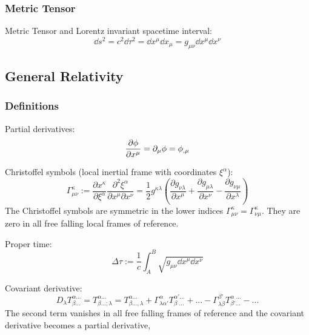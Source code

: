 	\subsubsection{Metric Tensor}
		Metric Tensor and Lorentz invariant spacetime interval:
		\begin{equation}
			\dd s^2 = c^2 \dd \tau^2 = \dd x^\mu \dd x_\mu = g_{\mu\nu} \dd x^\mu \dd x^\nu
		\end{equation}

	\subsection{General Relativity}
		\subsubsection{Definitions}
			\noindent
			Partial derivatives:
			\begin{equation}
				\frac{\partial \phi}{\partial x^\mu} = \partial_\mu \phi = \phi_{,\mu}
			\end{equation}

			\noindent
			Christoffel symbols (local inertial frame with coordinates $\xi^\alpha$):
			\begin{equation}
				\Gamma_{\mu\nu}^{\kappa} := \frac{\partial x^\kappa}{\partial \xi^\alpha}\frac{\partial^2 \xi^\alpha}{\partial x^\mu\partial x^\nu}
				=\frac{1}{2}g^{\kappa\lambda}\left(\frac{\partial g_{\nu\lambda}}{\partial x^\mu}+\frac{\partial g_{\mu\lambda}}{\partial x^\nu}-\frac{\partial g_{\nu\mu}}{\partial x^\lambda}\right)
			\end{equation}
			The Christoffel symbols are symmetric in the lower indices $\Gamma_{\mu\nu}^{\kappa} = \Gamma_{\nu\mu}^{\kappa}$. They are zero in all free falling local frames of reference.

			\noindent
			Proper time:
			\begin{equation}
				\Delta\tau := \frac{1}{c}\int_A^B\sqrt{g_{\mu\nu}\dd x^\mu \dd x^\nu}
			\end{equation}

			\noindent
			Covariant derivative:
			\begin{equation}
				D_\lambda T^{\alpha ...}_{\beta...} =
				T^{\alpha ...}_{\beta...;\lambda} = T^{\alpha...}_{\beta ...,\lambda}
				+ \Gamma^\alpha_{\lambda\alpha'} T^{\alpha'...}_{\beta\phantom{\prime}...} + ...
				-\Gamma^{\beta'}_{\lambda\beta} T^{\alpha\phantom{\prime}...}_{\beta'...} - ...
			\end{equation}
			The second term vanishes in all free falling frames of reference and the covariant derivative becomes a partial derivative, %

